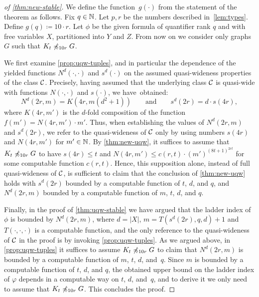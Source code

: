 \begin{proof}[of \cref{thm:new-stable}]We 
  define the function~$g(\cdot)$ from the statement of the theorem as follows. Fix $q\in \mathbb{N}$.  
  Let $p,r$ be the numbers described in~\cref{lem:types}. Define $g(q)\coloneqq 10\cdot r$.
	Let $\phi$ be the given formula of quantifier rank $q$ and with  free variables $X$, partitioned into $Y$ and $Z$.
 From now on we consider only graphs $G$ such that $K_t\not\preccurlyeq_{10r} G$.

We first examine \cref{prop:uqw-tuples}, and in particular the dependence of the yielded functions 
$N^d(\cdot,\cdot)$ and $s^d(\cdot)$ on the assumed quasi-wideness properties of the class $\mathcal{C}$.
Precisely, having assumed that the underlying class $\mathcal{C}$ is quasi-wide with functions $N(\cdot,\cdot)$ and $s(\cdot)$,
we have~obtained:
$$
N^d(2r,m)=K(4r,m(d^2+1))\qquad\textrm{and}\qquad s^d(2r)=d\cdot s(4r),
$$
where $K(4r,m')$ is the $d$-fold composition of the function $f(m')=N(4r,m')\cdot m'$.
Thus, when establishing the values of $N^d(2r,m)$ and $s^d(2r)$, we refer to the quasi-wideness of $\mathcal{C}$ only by using numbers $s(4r)$ and $N(4r,m')$ for $m'\in \mathbb{N}$.
By \cref{thm:new-uqw}, it suffices to assume that $K_t\not\preccurlyeq_{10r} G$ to have $s(4r)\leq t$ and $N(4r,m')\leq c(r,t)\cdot (m')^{(8t+1)^{2rt}}$ for some computable function $c(r,t)$.
Hence, this supposition alone, instead of full quasi-wideness of $\mathcal{C}$, is sufficient to claim that the conclusion of \cref{thm:new-uqw} holds with
$s^d(2r)$ bounded by a computable function of $t$, $d$, and $q$, and $N^d(2r,m)$ bounded by a computable function of $m$, $t$, $d$, and $q$.

	
Finally, in the proof of \cref{thm:uqw-stable} we have argued that the ladder index of $\phi$ is bounded by $N^d(2r,m)$, where $d=|X|$, $m=T(s^d(2r),q,d)+1$
and $T(\cdot,\cdot,\cdot)$ is a computable function,
and the only reference to the quasi-wideness of $\mathcal{C}$ in the proof
is by invoking \cref{prop:uqw-tuples}.
As we argued above, in \cref{prop:uqw-tuples} it suffices to assume $K_t\not\preccurlyeq_{10r} G$ to claim that $N^d(2r,m)$ is bounded by a computable function of $m$, $t$, $d$, and~$q$.
Since $m$ is bounded by a computable function of $t$, $d$, and $q$, the obtained upper bound on the ladder index of $\varphi$ depends in a computable way on $t$, $d$, and~$q$,
and to derive it we only need to assume that $K_t\not\preccurlyeq_{10r} G$. This concludes the proof.
\end{proof}

